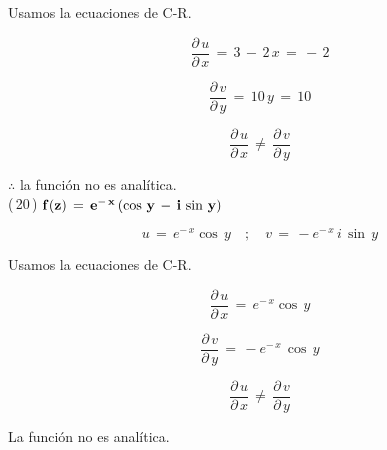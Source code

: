 \documentclass[a4paper,11pt,openany]{book}
\begin{document}
\textcolor{ao(english)}{} Usamos la ecuaciones de C-R.

$$\dfrac{\partial\,u}{\partial\,x}\,=\,3\,-\,2\,x\,=\,-\,2$$

$$\dfrac{\partial\,v}{\partial\,y}\,=\,10\,y\,=\,10$$

$$\dfrac{\partial\,u}{\partial\,x}\,\neq\,\dfrac{\partial\,v}{\partial\,y}$$

$\therefore$ la función no es analítica.\\

\textcolor{ao(english)}{(\,20\,)} $\bf{f(z)\,=\,e^{-\,x}\,(\cos\,y\,-\,i\,\sin\,y)}$

$$u\,=\,e^{-\,x}\cos\,y \quad;\quad v\,=\,-e^{-\,x}\,i\,\sin\,y$$

\textcolor{ao(english)}{} Usamos la ecuaciones de C-R.

$$\dfrac{\partial\,u}{\partial\,x}\,=\,e^{-\,x}\cos\,y$$

$$\dfrac{\partial\,v}{\partial\,y}\,=\,-e^{-\,x}\,\cos\,y$$

$$\dfrac{\partial\,u}{\partial\,x}\,\neq\,\dfrac{\partial\,v}{\partial\,y}$$

La función no es analítica.\\
\end{document}
